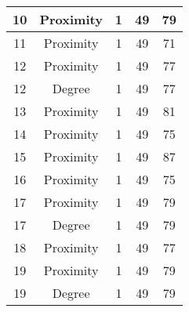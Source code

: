 \documentclass[results.tex]{subfiles}
\begin{document}
\begin{center}
\begin{tabular}{| c || c | c | c | c |}
            \hline
            10                      & Proximity                    & 1                      & 49                      & 79                   \\
            \hline
            11                      & Proximity                    & 1                      & 49                      & 71                   \\
            \hline
            12                      & Proximity                    & 1                      & 49                      & 77                   \\
            \hline
            12                      & Degree                       & 1                      & 49                      & 77                   \\
            \hline
            13                      & Proximity                    & 1                      & 49                      & 81                   \\
            \hline
            14                      & Proximity                    & 1                      & 49                      & 75                   \\
            \hline
            15                      & Proximity                    & 1                      & 49                      & 87                   \\
            \hline
            16                      & Proximity                    & 1                      & 49                      & 75                   \\
            \hline
            17                      & Proximity                    & 1                      & 49                      & 79                   \\
            \hline
            17                      & Degree                       & 1                      & 49                      & 79                   \\
            \hline
            18                      & Proximity                    & 1                      & 49                      & 77                   \\
            \hline
            19                      & Proximity                    & 1                      & 49                      & 79                   \\
            \hline
            19                      & Degree                       & 1                      & 49                      & 79                   \\

\end{tabular}
\end{center}
\end{document}
